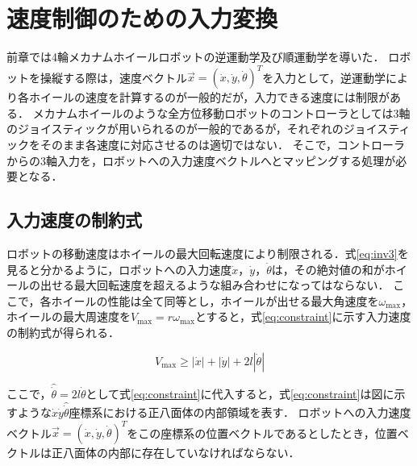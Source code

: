 \documentclass[../master]{subfiles}
\begin{document}
  \section{速度制御のための入力変換}

  前章では4輪メカナムホイールロボットの逆運動学及び順運動学を導いた．
  ロボットを操縦する際は，速度ベクトル$\vec{x} = (\dot{x}, \dot{y}, \dot{\theta})^T$を入力として，逆運動学により各ホイールの速度を計算するのが一般的だが，入力できる速度には制限がある．
  メカナムホイールのような全方位移動ロボットのコントローラとしては3軸のジョイスティックが用いられるのが一般的であるが，それぞれのジョイスティックをそのまま各速度に対応させるのは適切ではない．
  そこで，コントローラからの3軸入力を，ロボットへの入力速度ベクトルへとマッピングする処理が必要となる．

  \subsection{入力速度の制約式}

  ロボットの移動速度はホイールの最大回転速度により制限される．式\ref{eq:inv3}を見ると分かるように，ロボットへの入力速度$\dot{x}$，$\dot{y}$，$\dot{\theta}$は，その絶対値の和がホイールの出せる最大回転速度を超えるような組み合わせになってはならない．
  ここで，各ホイールの性能は全て同等とし，ホイールが出せる最大角速度を$\omega_{\text{max}}$，ホイールの最大周速度を$V_{\text{max}} = r \omega_{\text{max}}$とすると，式\ref{eq:constraint}に示す入力速度の制約式が得られる．

  \begin{equation}
    V_{\text{max}} \geq |\dot{x}| + |\dot{y}| + 2l|\dot{\theta}|
    \label{eq:constraint}
  \end{equation}

  \noindent
  ここで，$\hat{\dot{\theta}} = 2l\dot{\theta}$として式\ref{eq:constraint}に代入すると，式\ref{eq:constraint}は図に示すような$\dot{x}\dot{y}\hat{\dot{\theta}}$座標系における正八面体の内部領域を表す．
  ロボットへの入力速度ベクトル$\vec{x} = (\dot{x}, \dot{y}, \dot{\theta})^T$をこの座標系の位置ベクトルであるとしたとき，位置ベクトルは正八面体の内部に存在していなければならない．
\end{document}
